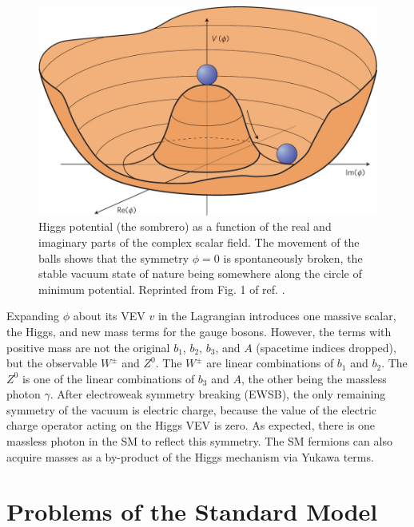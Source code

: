 \documentclass[dissertation.tex]{subfiles}
\begin{document}
\begin{figure}
	\centering
	\includegraphics[scale=0.3]{Higgs_potential}
	\caption{Higgs potential (the sombrero) as a function of the real and imaginary parts of the complex scalar field.  The movement of the balls shows that the symmetry $\phi = 0$ is spontaneously broken, the stable vacuum state of nature being somewhere along the circle of minimum potential.  Reprinted from Fig. 1 of ref. \cite{Alvarez-Gaume}.}
	\label{fig:Higgs_potential}
\end{figure}

Expanding $\phi$ about its VEV $v$ in the Lagrangian introduces one massive scalar, the Higgs, and new mass terms for the gauge bosons.  However, the terms with positive mass are not the original $b_{1}$, $b_{2}$, $b_{3}$, and $A$ (spacetime indices dropped), but the observable $W^{\pm}$ and $Z^{0}$.  The $W^{\pm}$ are linear combinations of $b_{1}$ and $b_{2}$.  The $Z^{0}$ is one of the linear combinations of $b_{3}$ and $A$, the other being the massless photon $\gamma$.  After electroweak symmetry breaking (EWSB), the only remaining symmetry of the vacuum is electric charge, because the value of the electric charge operator acting on the Higgs VEV is zero.  As expected, there is one massless photon in the SM to reflect this symmetry.  The SM fermions can also acquire masses as a by-product of the Higgs mechanism via Yukawa terms.

\section{Problems of the Standard Model}
\label{sec:Problems of the Standard Model}
\end{document}
